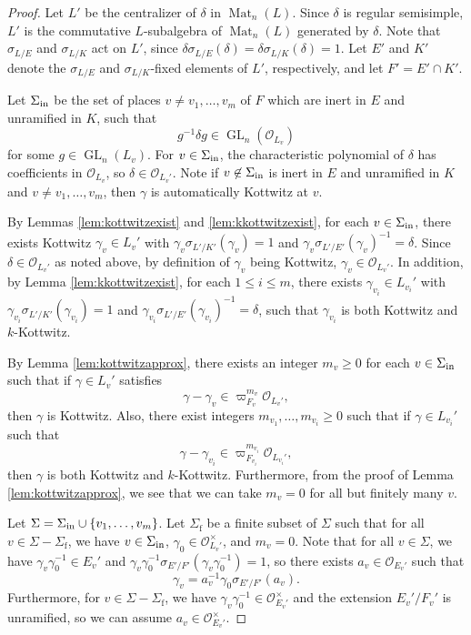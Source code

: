 \documentclass[11pt, reqno]{amsart}
\numberwithin{equation}{subsection}
\theoremstyle{plain}
\theoremstyle{definition}
\renewcommand{\O}{\mathcal O}
\DeclareMathOperator{\GL}{GL}
\DeclareMathOperator{\Mat}{Mat}
\newcommand{\inert}{\textnormal{in}}
\begin{document}
\begin{proof} 
Let $L'$ be the centralizer of $\delta$ in
$\Mat_n(L)$. 
Since $\delta$ is regular semisimple,
$L'$ is the commutative $L$-subalgebra of $\Mat_n(L)$ generated by
$\delta$. 
Note that $\sigma_{L/E}$ and $\sigma_{L/K}$
act on $L'$, since $\delta\sigma_{L/E}(\delta)
= \delta\sigma_{L/K}(\delta) = 1$.
Let $E'$ and $K'$ denote the $\sigma_{L/E}$ and
$\sigma_{L/K}$-fixed elements of
$L'$, respectively, and let $F' = E' \cap K'$. 

Let $\Sigma_{\inert}$ be the set of places $v \neq
v_1, \dots, v_m$ of $F$ which are inert in $E$ and unramified in $K$, such that
\[
    g^{-1}\delta g \in \GL_n(\O_{L_v})
\]
for some $g \in \GL_n(L_v)$.
For $v \in \Sigma_{\inert}$, the characteristic 
polynomial of $\delta$ has coefficients in $\O_{L_v}$,
so $\delta \in \O_{L_v'}$. Note if $v \not \in \Sigma_{\inert}$ is inert in $E$ and unramified in $K$ and $v \not = v_1, \hdots, v_m$, then $\gamma$ is automatically Kottwitz at $v$.

By Lemmas \ref{lem:kottwitzexist} and
\ref{lem:kkottwitzexist}, for each 
$v \in \Sigma_{\inert}$, there exists Kottwitz
$\gamma_v \in L_v'$ with 
$\gamma_v \sigma_{L'/K'}(\gamma_v) = 1$ and
$\gamma_v\sigma_{L'/E'}(\gamma_v)^{-1} = \delta$.
Since $\delta \in \O_{L_v'}$ as noted above,
by definition of $\gamma_v$ being Kottwitz, 
$\gamma_v \in \O_{L_v'}$.
In addition, by Lemma \ref{lem:kkottwitzexist},
for each $1 \le i \le m$,
there exists $\gamma_{v_i} \in L_{v_i}'$ with 
$\gamma_{v_i}\sigma_{L'/K'}(\gamma_{v_i}) = 1$ and
$\gamma_{v_i}\sigma_{L'/E'}(\gamma_{v_i})^{-1} = \delta$,
such that $\gamma_{v_i}$ is both Kottwitz
and $k$-Kottwitz.

By Lemma \ref{lem:kottwitzapprox}, there exists an
integer $m_v \ge 0$ for each $v \in \Sigma_{\inert}$
such that if $\gamma \in L_v'$ satisfies
\[
    \gamma - \gamma_v \in \varpi_{F_v}^{m_v}
    \O_{L_v'},
\]
then $\gamma$ is Kottwitz.
Also, there exist integers $m_{v_1}, \dots, m_{v_i}
\ge 0$ such that if $\gamma \in L_{v_i}'$ such that
\[
    \gamma - \gamma_{v_i} \in \varpi_{F_{v_i}}^{m_{v_i}}
    \O_{L_{v_i}'},
\]
then $\gamma$ is both Kottwitz and $k$-Kottwitz.
Furthermore, from the proof of Lemma \ref{lem:kottwitzapprox}, we see that we can take 
$m_v = 0$ for all but finitely many $v$.

Let $\Sigma = \Sigma_{\inert} \cup
\{v_1, \dots, v_m\}$.
Let $\Sigma_{\text{f}}$ be a finite subset of
$\Sigma$ such that for all $v \in \Sigma - \Sigma_{\text{f}}$,
we have $v \in \Sigma_{\inert}$,
$\gamma_0 \in \O_{L_v'}^\times$, and $m_v = 0$.
Note that for all $v \in \Sigma $, we have 
$\gamma_v\gamma_0^{-1} \in E_v'$ and 
$\gamma_v\gamma_0^{-1}\sigma_{E'/F'}
(\gamma_v\gamma_0^{-1}) = 1$, 
so there exists $a_v \in \O_{E_v'}$ such that
\[
    \gamma_v = a_v^{-1} \gamma_0 \sigma_{E'/F'}(a_v).
\]  
Furthermore, for $v \in \Sigma - \Sigma_{\text{f}}$,
we have $\gamma_v\gamma_0^{-1} \in \O_{E_v'}^\times$
and the extension $E_v'/F_v'$ is unramified, 
so we can assume $a_v \in \O_{E_v'}^\times$.


\end{proof}
\end{document}
